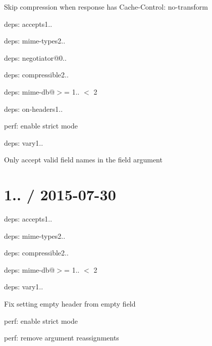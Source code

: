 \begin{DoxyItemize}
\item Skip compression when response has {\ttfamily Cache-\/\+Control\+: no-\/transform}
\item deps\+: accepts1..
\begin{DoxyItemize}
\item deps\+: mime-\/types2..
\item deps\+: negotiator@0..
\end{DoxyItemize}
\item deps\+: compressible2..
\begin{DoxyItemize}
\item deps\+: mime-\/db@\textquotesingle{}$>$= 1.. $<$ 2\textquotesingle{}
\end{DoxyItemize}
\item deps\+: on-\/headers1..
\begin{DoxyItemize}
\item perf\+: enable strict mode
\end{DoxyItemize}
\item deps\+: vary1..
\begin{DoxyItemize}
\item Only accept valid field names in the {\ttfamily field} argument
\end{DoxyItemize}
\end{DoxyItemize}

\section*{1.. / 2015-\/07-\/30 }


\begin{DoxyItemize}
\item deps\+: accepts1..
\begin{DoxyItemize}
\item deps\+: mime-\/types2..
\end{DoxyItemize}
\item deps\+: compressible2..
\begin{DoxyItemize}
\item deps\+: mime-\/db@\textquotesingle{}$>$= 1.. $<$ 2\textquotesingle{}
\end{DoxyItemize}
\item deps\+: vary1..
\begin{DoxyItemize}
\item Fix setting empty header from empty {\ttfamily field}
\item perf\+: enable strict mode
\item perf\+: remove argument reassignments
\end{DoxyItemize}
\end{DoxyItemize}

